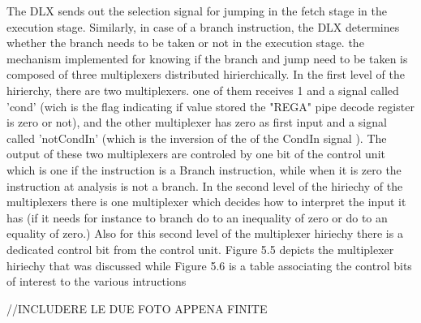 The DLX sends out the selection signal for jumping in the fetch stage in the execution stage. Similarly, in case of a branch instruction,
the DLX determines whether the branch needs to be taken or not in the execution stage. the mechanism implemented for knowing if the branch and
jump need to be taken is composed of three multiplexers distributed hirierchically. In the first level of the hirierchy, there are two multiplexers.
one of them receives 1 and a signal called 'cond' (wich is the flag indicating if value stored the "REGA" pipe decode register is zero or not), and the other multiplexer has zero as first input 
and a signal called 'notCondIn' (which is the inversion of the of the CondIn signal ). The output of these two multiplexers are controled by one bit of the 
control unit which is one if the instruction is a Branch instruction, while when it is zero the instruction at analysis is not a branch. 
In the  second level of the hiriechy of the multiplexers there is one multiplexer which decides how to interpret the input it has (if it needs for instance
to branch do to an inequality of zero or do to an equality of zero.) Also for this second level of the multiplexer hiriechy there is a dedicated control bit from the  control unit.
Figure 5.5 depicts the multiplexer hiriechy that was discussed while Figure 5.6 is a table associating the control bits of interest to the various intructions

//INCLUDERE LE DUE FOTO APPENA FINITE


